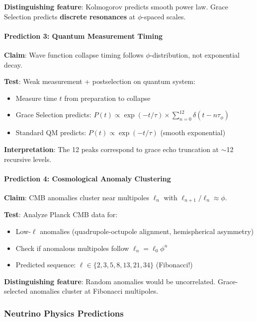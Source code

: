 \documentclass[12pt,a4paper]{article}
\begin{document}
\textbf{Distinguishing feature}: Kolmogorov predicts smooth power law. Grace Selection predicts \textbf{discrete resonances} at $\phi$-spaced scales.

\paragraph{Prediction 3: Quantum Measurement Timing}

\textbf{Claim}: Wave function collapse timing follows $\phi$-distribution, not exponential decay.

\textbf{Test}: Weak measurement + postselection on quantum system:
\begin{itemize}
\item Measure time $t$ from preparation to collapse
\item Grace Selection predicts: $P(t) \propto \exp(-t/\tau) \times \sum_{n=0}^{12} \delta(t - n\tau_\phi)$
\item Standard QM predicts: $P(t) \propto \exp(-t/\tau)$ (smooth exponential)
\end{itemize}

\textbf{Interpretation}: The 12 peaks correspond to grace echo truncation at $\sim$12 recursive levels.

\paragraph{Prediction 4: Cosmological Anomaly Clustering}

\textbf{Claim}: CMB anomalies cluster near multipoles $\ell_n$ with $\ell_{n+1}/\ell_n \approx \phi$.

\textbf{Test}: Analyze Planck CMB data for:
\begin{itemize}
\item Low-$\ell$ anomalies (quadrupole-octupole alignment, hemispherical asymmetry)
\item Check if anomalous multipoles follow $\ell_n = \ell_0 \phi^n$
\item Predicted sequence: $\ell \in \{2, 3, 5, 8, 13, 21, 34\}$ (Fibonacci!)
\end{itemize}

\textbf{Distinguishing feature}: Random anomalies would be uncorrelated. Grace-selected anomalies cluster at Fibonacci multipoles.

\subsubsection{Neutrino Physics Predictions}
\end{document}
